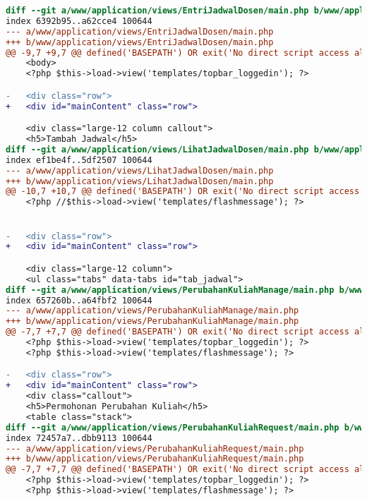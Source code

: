 \begin{lstlisting}[frame=single, label={lst:perbaikan_2.4.1_bypass_blocks}, language=diff, caption=Perbaikan Kriteria Sukses 2.4.1 - Mekanisme untuk Melompati Area Konten yang Berulang]
diff --git a/www/application/views/EntriJadwalDosen/main.php b/www/application/views/EntriJadwalDosen/main.php
index 6392b95..a62cce4 100644
--- a/www/application/views/EntriJadwalDosen/main.php
+++ b/www/application/views/EntriJadwalDosen/main.php
@@ -9,7 +9,7 @@ defined('BASEPATH') OR exit('No direct script access allowed');
    <body>
    <?php $this->load->view('templates/topbar_loggedin'); ?>

-   <div class="row">
+   <div id="mainContent" class="row">

    <div class="large-12 column callout">
    <h5>Tambah Jadwal</h5>
diff --git a/www/application/views/LihatJadwalDosen/main.php b/www/application/views/LihatJadwalDosen/main.php
index ef1be4f..5df2507 100644
--- a/www/application/views/LihatJadwalDosen/main.php
+++ b/www/application/views/LihatJadwalDosen/main.php
@@ -10,7 +10,7 @@ defined('BASEPATH') OR exit('No direct script access allowed');
    <?php //$this->load->view('templates/flashmessage'); ?>


-   <div class="row">
+   <div id="mainContent" class="row">

    <div class="large-12 column">
    <ul class="tabs" data-tabs id="tab_jadwal">
diff --git a/www/application/views/PerubahanKuliahManage/main.php b/www/application/views/PerubahanKuliahManage/main.php
index 657260b..a64fbf2 100644
--- a/www/application/views/PerubahanKuliahManage/main.php
+++ b/www/application/views/PerubahanKuliahManage/main.php
@@ -7,7 +7,7 @@ defined('BASEPATH') OR exit('No direct script access allowed');
    <?php $this->load->view('templates/topbar_loggedin'); ?>
    <?php $this->load->view('templates/flashmessage'); ?>

-   <div class="row">
+   <div id="mainContent" class="row">
    <div class="callout">
    <h5>Permohonan Perubahan Kuliah</h5>
    <table class="stack">
diff --git a/www/application/views/PerubahanKuliahRequest/main.php b/www/application/views/PerubahanKuliahRequest/main.php
index 72457a7..dbb9113 100644
--- a/www/application/views/PerubahanKuliahRequest/main.php
+++ b/www/application/views/PerubahanKuliahRequest/main.php
@@ -7,7 +7,7 @@ defined('BASEPATH') OR exit('No direct script access allowed');
    <?php $this->load->view('templates/topbar_loggedin'); ?>
    <?php $this->load->view('templates/flashmessage'); ?>


\end{lstlisting}

